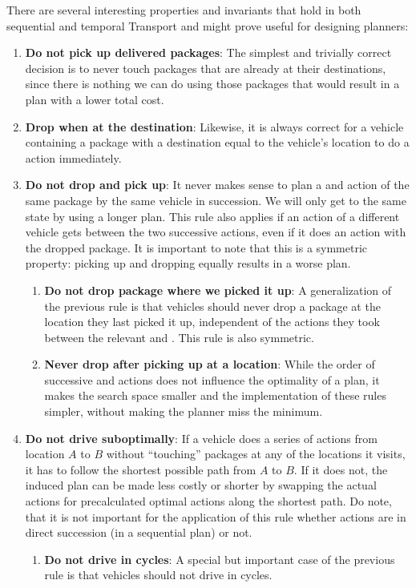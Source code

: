 There are several interesting properties and invariants that hold in both sequential and temporal Transport and might prove useful for designing planners:
\begin{enumerate}
\item \textbf{Do not pick up delivered packages}: The simplest and trivially correct decision is to never touch packages that are already at their destinations, since there is nothing
we can do using those packages that would result in a plan with a lower total cost.

\item \textbf{Drop when at the destination}: Likewise, it is
always correct for a vehicle containing a package with a destination equal
to the vehicle's location to do a \drop{} action immediately.

\item \textbf{Do not drop and pick up}: It never makes sense to plan a \drop{} and \pickup{}
action of
the same package by the same vehicle in succession. We will only get to the same state
by using a longer plan. This rule also applies if an action of a different vehicle
gets between the two successive actions, even if it does an action with the
dropped package.
It is important to note that this is a symmetric property: picking up and dropping
equally results in a worse plan.
\begin{enumerate}
\item \textbf{Do not drop package where we picked it up}: A generalization
of the previous rule is that vehicles should never drop a package
at the location they last picked it up, independent of the actions they took
between the relevant \pickup{} and \drop{}. This rule is also symmetric.

\item \textbf{Never drop after picking up at a location}:
While the order of successive \pickup{} and \drop{} actions does not
influence the optimality of a plan, it makes the search space smaller and the implementation of these rules simpler,
without making the planner miss the minimum.
\end{enumerate}

\item \textbf{Do not drive suboptimally}: If a vehicle does a series of
\drive{} actions from location $A$ to $B$ without ``touching'' packages at any of the locations it visits,
it has to follow the shortest possible path from $A$ to $B$. If it does not,
the induced plan can be made less costly or shorter by swapping the actual \drive{} actions
for precalculated optimal \drive{} actions along the shortest path.
Do note, that it is not important for the application of this rule whether actions are in direct succession (in a sequential plan) or not.
\begin{enumerate}
\item \textbf{Do not drive in cycles}: A special but important case of the previous rule is that vehicles should not drive in cycles.
\end{enumerate}


\end{enumerate}
